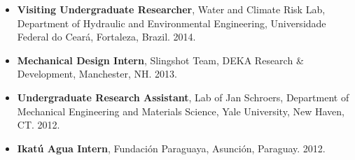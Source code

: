 \documentclass[10pt,oneside]{article}
\begin{document}
\begin{itemize}[label={}]
  \item \textbf{Visiting Undergraduate Researcher}, Water and Climate Risk Lab, Department of Hydraulic and Environmental Engineering, Universidade Federal do Ceará, Fortaleza, Brazil. 2014.
  
  \item \textbf{Mechanical Design Intern}, Slingshot Team, DEKA Research \& Development, Manchester, NH. 2013.
  
  \item \textbf{Undergraduate Research Assistant}, Lab of Jan Schroers, Department of Mechanical Engineering and Materials Science, Yale University, New Haven, CT. 2012.
  
  \item \textbf{Ikatú Agua Intern}, Fundación Paraguaya, Asunción, Paraguay. 2012.
  
\end{itemize}
\end{document}
